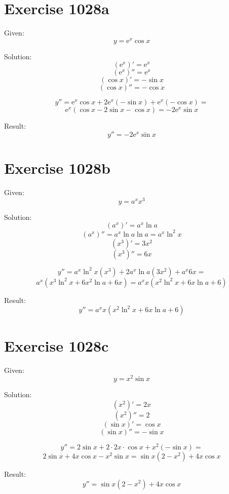 \documentclass[a4paper, 10pt]{scrartcl}
\newcommand*\euler{\mathrm{e}}
\begin{document}
\section{Exercise 1028a}

Given:
\[
y = \euler^{x}\cos{x}
\]

Solution:
\[
(\euler^{x})' = \euler^{x}
\]
\[
(\euler^{x})'' = \euler^{x}
\]
\[
(\cos{x})' = -\sin{x}
\]
\[
(\cos{x})'' = -\cos{x}
\]

\[
y'' = \euler^{x}\cos{x} + 2\euler^{x}(-\sin{x}) + \euler^{x}(-\cos{x}) =
\]
\[
\euler^{x}(\cos{x} - 2\sin{x} - \cos{x}) = -2\euler^{x}\sin{x}
\]

Result:
\[
y'' = -2\euler^{x}\sin{x}
\]

\section{Exercise 1028b}

Given:
\[
y = a^{x}x^{3}
\]

Solution:
\[
(a^{x})' = a^{x}\ln{a}
\]
\[
(a^{x})'' = a^{x}\ln{a}\ln{a} = a^{x}\ln^{2}{x}
\]
\[
(x^{3})' = 3x^{2}
\]
\[
(x^{3})'' = 6x
\]

\[
y'' = a^{x}\ln^{2}{x}(x^{3}) + 2a^{x}\ln{a}(3x^{2}) + a^{x}6x =
\]
\[
a^{x}(x^{3}\ln^{2}{x} + 6x^{2}\ln{a} + 6x) = a^{x}x(x^{2}\ln^{2}{x} + 6x\ln{a} + 6)
\]

Result:
\[
y'' = a^{x}x(x^{2}\ln^{2}{x} + 6x\ln{a} + 6)
\]

\section{Exercise 1028c}

Given:
\[
y = x^{2}\sin{x}
\]

Solution:
\[
(x^{2})' = 2x
\]
\[
(x^{2})'' = 2
\]
\[
(\sin{x})' = \cos{x}
\]
\[
(\sin{x})'' = -\sin{x}
\]

\[
y'' = 2\sin{x} + 2\cdot 2x\cdot\cos{x} + x^{2}(-\sin{x}) =
\]
\[
2\sin{x} + 4x\cos{x} - x^{2}\sin{x} = \sin{x}(2 - x^{2}) + 4x\cos{x}
\]

Result:
\[
y'' = \sin{x}(2 - x^{2}) + 4x\cos{x}
\]
\end{document}
